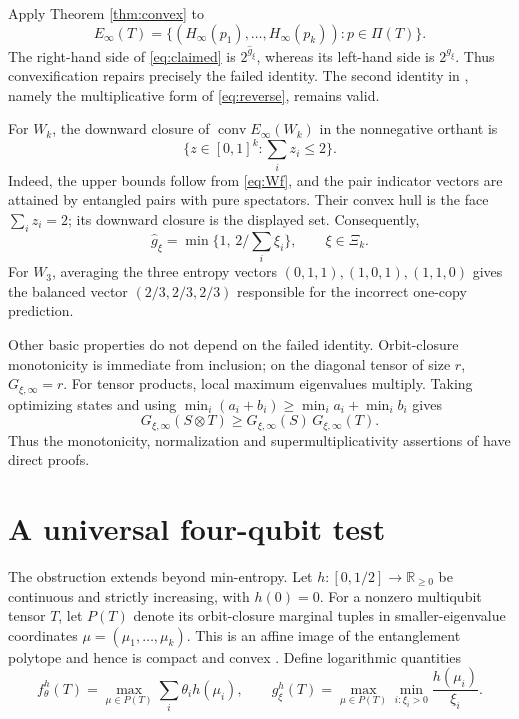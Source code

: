 \documentclass[11pt,a4paper]{article}
\newcommand{\R}{\mathbb R}
\newcommand{\conv}{\operatorname{conv}}
\newcommand{\Hinf}{H_{\infty}}
\begin{document}
Apply Theorem \ref{thm:convex} to
\[
 E_\infty(T)=\{(\Hinf(p_1),\ldots,\Hinf(p_k)):p\in\Pi(T)\}.
\]
The right-hand side of \eqref{eq:claimed} is \(2^{\widehat g_\xi}\),
whereas its left-hand side is \(2^{g_\xi}\). Thus convexification
repairs precisely the failed identity. The second identity in
\cite[Theorem 60]{CLZ}, namely the multiplicative form of
\eqref{eq:reverse}, remains valid.

For \(W_k\), the downward closure of \(\conv E_\infty(W_k)\) in
the nonnegative orthant is
\[
 \{z\in[0,1]^k:\textstyle\sum_i z_i\le2\}.
\]
Indeed, the upper bounds follow from \eqref{eq:Wf}, and the pair
indicator vectors are attained by entangled pairs with pure spectators.
Their convex hull is the face \(\sum_i z_i=2\); its downward closure
is the displayed set. Consequently,
\begin{equation}
 \widehat g_\xi=\min\{1,\,2/\textstyle\sum_i\xi_i\},
 \qquad \xi\in\Xi_k.
 \label{eq:Wconvex}
\end{equation}
For \(W_3\), averaging the three entropy vectors
\((0,1,1),(1,0,1),(1,1,0)\) gives the balanced vector
\((2/3,2/3,2/3)\) responsible for the incorrect one-copy prediction.

Other basic properties do not depend on the failed identity.
Orbit-closure monotonicity is immediate from inclusion; on the
diagonal tensor of size \(r\), \(G_{\xi,\infty}=r\).
For tensor products, local maximum eigenvalues multiply. Taking
optimizing states and using
\(\min_i(a_i+b_i)\ge\min_i a_i+\min_i b_i\) gives
\[
 G_{\xi,\infty}(S\otimes T)
 \ge G_{\xi,\infty}(S)\,G_{\xi,\infty}(T).
\]
Thus the monotonicity, normalization and supermultiplicativity
assertions of \cite[Corollary 61]{CLZ} have direct proofs.

\section{A universal four-qubit test}\label{sec:criterion}
The obstruction extends beyond min-entropy. Let
\(h:[0,1/2]\to\R_{\ge0}\) be continuous and strictly increasing,
with \(h(0)=0\). For a nonzero multiqubit tensor \(T\), let
\(P(T)\) denote its orbit-closure marginal tuples in smaller-eigenvalue
coordinates \(\mu=(\mu_1,\ldots,\mu_k)\). This is an affine image of
the entanglement polytope and hence is compact and convex
\cite[Supplementary Information, Corollary 2]{Walter}.
Define logarithmic quantities
\[
 f^h_\theta(T)=\max_{\mu\in P(T)}\sum_i\theta_i h(\mu_i),\qquad
 g^h_\xi(T)=\max_{\mu\in P(T)}\min_{i:\xi_i>0}\frac{h(\mu_i)}{\xi_i}.
\]
\end{document}
